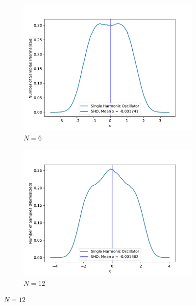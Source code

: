 \documentclass[../main.tex]{subfiles}
\begin{document}
\begin{figure}
\medskip
\begin{subfigure}{0.48\textwidth}
\includegraphics[width=\linewidth]{figures/densitySHO/density_SHO_N6_Omega1_2d_x}
\caption{$N=6$} \label{fig:SHO_N6_2d_x_c}
\end{subfigure}\hspace*{\fill}
\begin{subfigure}{0.48\textwidth}
\includegraphics[width=\linewidth]{figures/densitySHO/density_SHO_N12_Omega1_2d_x}
\caption{$N=12$} \label{fig:SHO_N12_2d_x_d}
\end{subfigure}


\end{figure}
\end{document}

